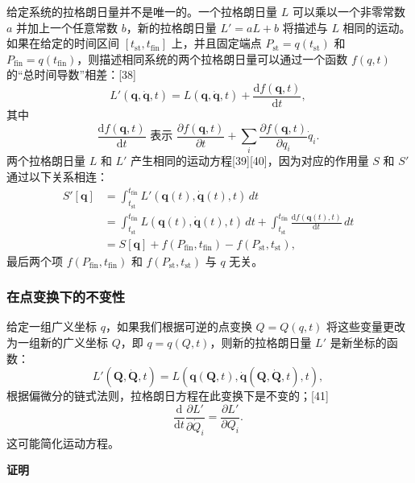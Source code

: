 给定系统的拉格朗日量并不是唯一的。一个拉格朗日量 \( L \) 可以乘以一个非零常数 \( a \) 并加上一个任意常数 \( b \)，新的拉格朗日量 \( L' = aL + b \) 将描述与 \( L \) 相同的运动。如果在给定的时间区间 \([t_{\text{st}}, t_{\text{fin}}]\) 上，并且固定端点 \( P_{\text{st}} = q(t_{\text{st}}) \) 和 \( P_{\text{fin}} = q(t_{\text{fin}}) \)，则描述相同系统的两个拉格朗日量可以通过一个函数 \( f(q, t) \) 的“总时间导数”相差：[38]
\[
L'(\mathbf{q}, \dot{\mathbf{q}}, t) = L(\mathbf{q}, \dot{\mathbf{q}}, t) + \frac{\mathrm{d} f(\mathbf{q}, t)}{\mathrm{d} t},~
\]
其中 
\[
\frac{\mathrm{d} f(\mathbf{q}, t)}{\mathrm{d} t} \text{ 表示 } \frac{\partial f(\mathbf{q}, t)}{\partial t} + \sum_{i} \frac{\partial f(\mathbf{q}, t)}{\partial q_{i}} \dot{q}_{i}.~
\]
两个拉格朗日量 \( L \) 和 \( L' \) 产生相同的运动方程[39][40]，因为对应的作用量 \( S \) 和 \( S' \) 通过以下关系相连：
\[
\begin{aligned}
S'[\mathbf{q}] &= \int_{t_{\text{st}}}^{t_{\text{fin}}} L'(\mathbf{q}(t), \dot{\mathbf{q}}(t), t) \, dt \\
&= \int_{t_{\text{st}}}^{t_{\text{fin}}} L(\mathbf{q}(t), \dot{\mathbf{q}}(t), t) \, dt + \int_{t_{\text{st}}}^{t_{\text{fin}}} \frac{\mathrm{d} f(\mathbf{q}(t), t)}{\mathrm{d} t} \, dt \\
&= S[\mathbf{q}] + f(P_{\text{fin}}, t_{\text{fin}}) - f(P_{\text{st}}, t_{\text{st}}),
\end{aligned}~
\]
最后两个项 \( f(P_{\text{fin}}, t_{\text{fin}}) \) 和 \( f(P_{\text{st}}, t_{\text{st}}) \) 与 \( q \) 无关。
\subsubsection{在点变换下的不变性}
给定一组广义坐标 \( q \)，如果我们根据可逆的点变换 \( Q = Q(q, t) \) 将这些变量更改为一组新的广义坐标 \( Q \)，即 \( q = q(Q, t) \)，则新的拉格朗日量 \( L' \) 是新坐标的函数：
\[
L'(\mathbf{Q}, \dot{\mathbf{Q}}, t) = L(\mathbf{q}(\mathbf{Q}, t), \dot{\mathbf{q}}(\mathbf{Q}, \dot{\mathbf{Q}}, t), t),~
\]
根据偏微分的链式法则，拉格朗日方程在此变换下是不变的；[41]
\[
\frac{\mathrm{d}}{\mathrm{d} t} \frac{\partial L'}{\partial \dot{Q}_{i}} = \frac{\partial L'}{\partial Q_{i}}.~
\]
这可能简化运动方程。

\textbf{证明}

